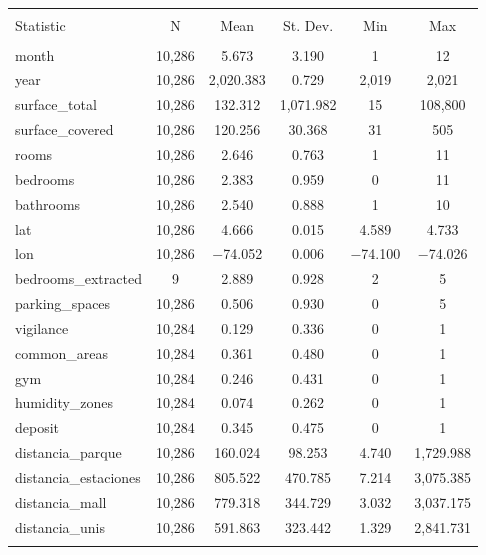 
\begin{table}[!htbp] \centering 
  \caption{} 
  \label{} 
\begin{tabular}{@{\extracolsep{5pt}}lccccc} 
\\[-1.8ex]\hline 
\hline \\[-1.8ex] 
Statistic & \multicolumn{1}{c}{N} & \multicolumn{1}{c}{Mean} & \multicolumn{1}{c}{St. Dev.} & \multicolumn{1}{c}{Min} & \multicolumn{1}{c}{Max} \\ 
\hline \\[-1.8ex] 
month & 10,286 & 5.673 & 3.190 & 1 & 12 \\ 
year & 10,286 & 2,020.383 & 0.729 & 2,019 & 2,021 \\ 
surface\_total & 10,286 & 132.312 & 1,071.982 & 15 & 108,800 \\ 
surface\_covered & 10,286 & 120.256 & 30.368 & 31 & 505 \\ 
rooms & 10,286 & 2.646 & 0.763 & 1 & 11 \\ 
bedrooms & 10,286 & 2.383 & 0.959 & 0 & 11 \\ 
bathrooms & 10,286 & 2.540 & 0.888 & 1 & 10 \\ 
lat & 10,286 & 4.666 & 0.015 & 4.589 & 4.733 \\ 
lon & 10,286 & $-$74.052 & 0.006 & $-$74.100 & $-$74.026 \\ 
bedrooms\_extracted & 9 & 2.889 & 0.928 & 2 & 5 \\ 
parking\_spaces & 10,286 & 0.506 & 0.930 & 0 & 5 \\ 
vigilance & 10,284 & 0.129 & 0.336 & 0 & 1 \\ 
common\_areas & 10,284 & 0.361 & 0.480 & 0 & 1 \\ 
gym & 10,284 & 0.246 & 0.431 & 0 & 1 \\ 
humidity\_zones & 10,284 & 0.074 & 0.262 & 0 & 1 \\ 
deposit & 10,284 & 0.345 & 0.475 & 0 & 1 \\ 
distancia\_parque & 10,286 & 160.024 & 98.253 & 4.740 & 1,729.988 \\ 
distancia\_estaciones & 10,286 & 805.522 & 470.785 & 7.214 & 3,075.385 \\ 
distancia\_mall & 10,286 & 779.318 & 344.729 & 3.032 & 3,037.175 \\ 
distancia\_unis & 10,286 & 591.863 & 323.442 & 1.329 & 2,841.731 \\ 
\hline \\[-1.8ex] 
\end{tabular} 
\end{table} 
